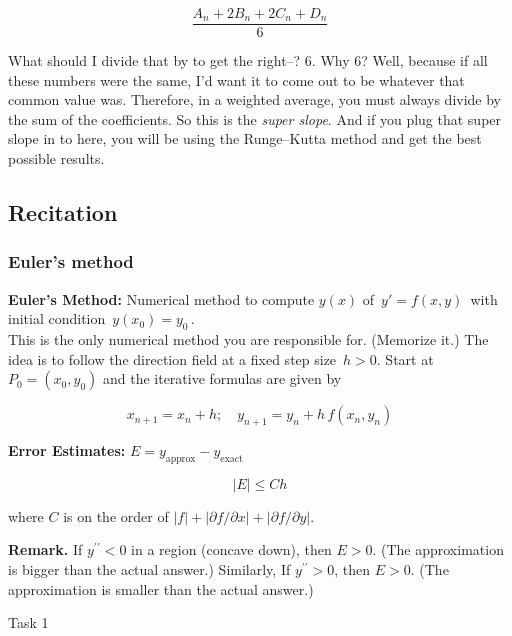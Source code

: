 \begin{equation*}
  \frac{A_n + 2B_n + 2C_n + D_n}{6}
\end{equation*}

What should I divide that by to get the right--?
$6$. Why $6$?
Well, because if all these numbers were the same,
I'd want it to come out to be whatever that common value was.
Therefore, in a weighted average, you must always divide by the sum of the coefficients.
So this is the \emph{super slope}.
And if you plug that super slope in to here, you will be using the Runge--Kutta method and get
the best possible results.

\clearpage

\subsection{Recitation}

\subsubsection{Euler's method}

\textbf{Euler's Method:}
Numerical method to compute $y(x)$ of $\, y' = f(x,y) \,$ with initial condition
$\, y(x_0) =y_0\,$. \\

This is the only numerical method you are responsible for. (Memorize it.)
The idea is to follow the direction field at a fixed step size
$\, h > 0$.
Start at $P_0=(x_0,y_0)$ and the iterative formulas are given by

\begin{equation*}
  x_{n+1} = x_ n + h; \quad y_{n+1} = y_ n + h\,  f(x_ n,y_ n)
\end{equation*}

\textbf{Error Estimates:} $E = y_{\textrm{approx}} - y_{\textrm{exact}}$

\begin{equation*}
  |E|\le Ch
\end{equation*}

where $C$ is on the order of $|f| + |\partial f/\partial x| + |\partial f/\partial y|$.

\textbf{Remark.} If $y^{\prime \prime }<0$  in a region (concave down), then $E>0$.
(The approximation is bigger than the actual answer.)
Similarly, If $y^{\prime \prime } > 0$, then $E>0$.
(The approximation is smaller than the actual answer.)

\begin{problem}
  Task 1
\end{problem}

